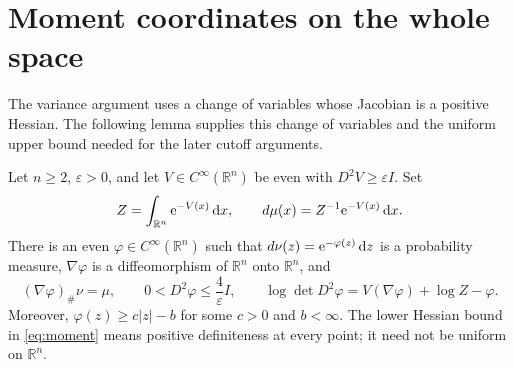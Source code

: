 \section{Moment coordinates on the whole space}\label{sec:moment}

The variance argument uses a change of variables whose Jacobian is a positive Hessian.  The following lemma supplies this change of variables and the uniform upper bound needed for the later cutoff arguments.

\begin{lemma}\label{lem:moment}
Let $n\ge2$, $\varepsilon>0$, and let $V\in C^\infty(\mathbb{R}^n)$ be even with $D^2V\ge\varepsilon I$.  Set
\[
 Z=\int_{\mathbb{R}^n}\mathrm{e}^{-V(x)}\,\mathrm{d} x,
 \qquad d\mu(x)=Z^{-1}\mathrm{e}^{-V(x)}\,\mathrm{d} x.
\]
There is an even $\varphi\in C^\infty(\mathbb{R}^n)$ such that $d\nu(z)=\mathrm{e}^{-\varphi(z)}\,\mathrm{d} z$ is a probability measure, $\nabla\varphi$ is a diffeomorphism of $\mathbb{R}^n$ onto $\mathbb{R}^n$, and
\begin{equation}\label{eq:moment}
 (\nabla\varphi)_\#\nu=\mu,
 \qquad 0<D^2\varphi\le\frac4\varepsilon I,
 \qquad
 \log\det D^2\varphi
   =V(\nabla\varphi)+\log Z-\varphi.
\end{equation}
Moreover, $\varphi(z)\ge c|z|-b$ for some $c>0$ and $b<\infty$. The lower Hessian bound in \eqref{eq:moment} means positive definiteness at every point; it need not be uniform on $\mathbb{R}^n$.
\end{lemma}

